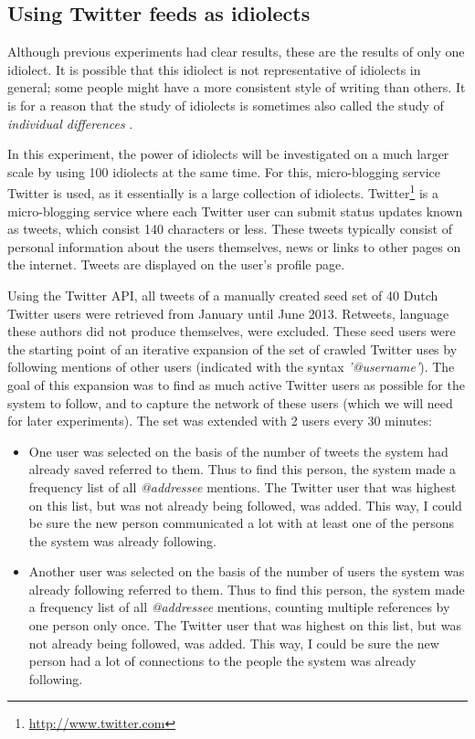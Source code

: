 \documentclass[11pt]{article}
\begin{document}
\subsection{Using Twitter feeds as idiolects} \label{twitter_idiolects}

Although previous experiments had clear results, these are the results of only one idiolect. It is possible that this idiolect is not representative of idiolects in general; some people might have a more consistent style of writing than others. It is for a reason that the study of idiolects is sometimes also called the study of \emph{individual differences} \cite{barlow10}. 

In this experiment, the power of idiolects will be investigated on a much larger scale by using 100 idiolects at the same time. For this, micro-blogging service Twitter is used, as it essentially is a large collection of idiolects. Twitter\footnote{\url{http://www.twitter.com}} is a micro-blogging service where each Twitter user can submit status updates known as tweets, which consist 140 characters or less. These tweets typically consist of personal information about the users themselves, news or links to other pages on the internet. Tweets are displayed on the user's profile page. 

Using the Twitter API, all tweets of a manually created seed set of 40 Dutch Twitter users were retrieved from January until June 2013. Retweets, language these authors did not produce themselves, were excluded. These seed users were the starting point of an iterative expansion of the set of crawled Twitter uses by following mentions of other users (indicated with the syntax \emph{'@username'}). The goal of this expansion was to find as much active Twitter users as possible for the system to follow, and to capture the network of these users (which we will need for later experiments). The set was extended with 2 users every 30 minutes:

\begin{itemize}
\item One user was selected on the basis of the number of tweets the system had already saved referred to them. Thus to find this person, the system made a frequency list of all \emph{@addressee} mentions. The Twitter user that was highest on this list, but was not already being followed, was added. This way, I could be sure the new person communicated a lot with at least one of the persons the system was already following.
\item Another user was selected on the basis of the number of users the system was already following referred to them. Thus to find this person, the system made a frequency list of all \emph{@addressee} mentions, counting multiple references by one person only once. The Twitter user that was highest on this list, but was not already being followed, was added. This way, I could be sure the new person had a lot of connections to the people the system was already following.
\end{itemize}
\end{document}
